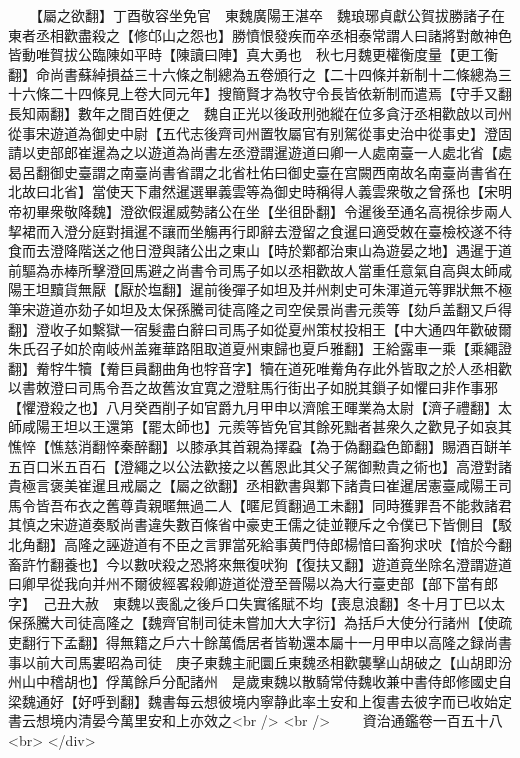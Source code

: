 　　【屬之欲翻】丁酉敬容坐免官　東魏廣陽王湛卒　魏琅琊貞獻公賀拔勝諸子在東者丞相歡盡殺之【修邙山之怨也】勝憤恨發疾而卒丞相泰常謂人曰諸將對敵神色皆動唯賀拔公臨陳如平時【陳讀曰陣】真大勇也　秋七月魏更權衡度量【更工衡翻】命尚書蘇綽損益三十六條之制總為五卷頒行之【二十四條并新制十二條總為三十六條二十四條見上卷大同元年】搜簡賢才為牧守令長皆依新制而遣焉【守手又翻長知兩翻】數年之間百姓便之　魏自正光以後政刑弛縱在位多貪汙丞相歡啟以司州從事宋遊道為御史中尉【五代志後齊司州置牧屬官有别駕從事史治中從事史】澄固請以吏部郎崔暹為之以遊道為尚書左丞澄謂暹遊道曰卿一人處南臺一人處北省【處曷呂翻御史臺謂之南臺尚書省謂之北省杜佑曰御史臺在宫闕西南故名南臺尚書省在北故曰北省】當使天下肅然暹選畢義雲等為御史時稱得人義雲衆敬之曾孫也【宋明帝初畢衆敬降魏】澄欲假暹威勢諸公在坐【坐徂卧翻】令暹後至通名高視徐步兩人挈裙而入澄分庭對揖暹不讓而坐觴再行即辭去澄留之食暹曰適受敇在臺檢校遂不待食而去澄降階送之他日澄與諸公出之東山【時於鄴都治東山為遊晏之地】遇暹于道前驅為赤棒所擊澄回馬避之尚書令司馬子如以丞相歡故人當重任意氣自高與太師咸陽王坦黷貨無厭【厭於塩翻】暹前後彈子如坦及并州刺史可朱渾道元等罪狀無不極筆宋遊道亦劾子如坦及太保孫騰司徒高隆之司空侯景尚書元羨等【劾戶盖翻又戶得翻】澄收子如繫獄一宿髮盡白辭曰司馬子如從夏州策杖投相王【中大通四年歡破爾朱氏召子如於南岐州盖雍華路阻取道夏州東歸也夏戶雅翻】王給露車一乘【乘繩證翻】觠牸牛犢【觠巨員翻曲角也牸音字】犢在道死唯觠角存此外皆取之於人丞相歡以書敇澄曰司馬令吾之故舊汝宜寛之澄駐馬行街出子如脱其鎻子如懼曰非作事邪【懼澄殺之也】八月癸酉削子如官爵九月甲申以濟隂王暉業為太尉【濟子禮翻】太師咸陽王坦以王還第【罷太師也】元羨等皆免官其餘死黜者甚衆久之歡見子如哀其憔悴【憔慈消翻悴秦醉翻】以膝承其首親為擇蝨【為于偽翻蝨色節翻】賜酒百缾羊五百口米五百石【澄繩之以公法歡接之以舊恩此其父子駕御勲貴之術也】高澄對諸貴極言褒美崔暹且戒屬之【屬之欲翻】丞相歡書與鄴下諸貴曰崔暹居憲臺咸陽王司馬令皆吾布衣之舊尊貴親暱無過二人【暱尼質翻過工未翻】同時獲罪吾不能救諸君其慎之宋遊道奏駁尚書違失數百條省中豪吏王儒之徒並鞭斥之令僕已下皆側目【駁北角翻】高隆之誣遊道有不臣之言罪當死給事黄門侍郎楊愔曰畜狗求吠【愔於今翻畜許竹翻養也】今以數吠殺之恐將來無復吠狗【復扶又翻】遊道竟坐除名澄謂遊道曰卿早從我向并州不爾彼經畧殺卿遊道從澄至晉陽以為大行臺吏部【部下當有郎字】　己丑大赦　東魏以喪亂之後戶口失實徭賦不均【喪息浪翻】冬十月丁巳以太保孫騰大司徒高隆之【魏齊官制司徒未嘗加大大字衍】為括戶大使分行諸州【使疏吏翻行下孟翻】得無籍之戶六十餘萬僑居者皆勒還本屬十一月甲申以高隆之録尚書事以前大司馬婁昭為司徒　庚子東魏主祀圜丘東魏丞相歡襲擊山胡破之【山胡即汾州山中稽胡也】俘萬餘戶分配諸州　是歲東魏以散騎常侍魏收兼中書侍郎修國史自梁魏通好【好呼到翻】魏書每云想彼境内寧静此率土安和上復書去彼字而已收始定書云想境内清晏今萬里安和上亦效之<br />
<br />
　　資治通鑑卷一百五十八  <br>
   </div> 

